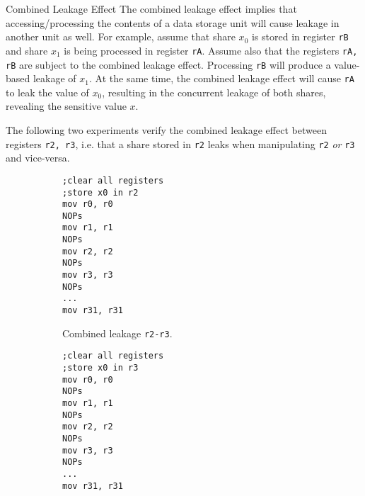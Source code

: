\begin{subsection}{Combined Leakage Effect}
\label{combined_leakage}
The combined leakage effect implies that accessing/processing the contents of a data storage unit will cause leakage in another unit as well. For example, assume that share $x_0$ is stored in register \texttt{rB} and share $x_1$ is being processed in register \texttt{rA}. Assume also that the registers \texttt{rA, rB} are subject to the combined leakage effect. Processing \texttt{rB} will produce a value-based leakage of $x_1$. At the same time, the combined leakage effect will cause \texttt{rA} to leak the value of $x_0$, resulting in the concurrent leakage of both shares, revealing the sensitive value $x$.

The following two experiments verify the combined leakage effect between registers \texttt{r2, r3}, i.e. that a share stored in \texttt{r2} leaks when manipulating \texttt{r2} \emph{or} \texttt{r3} and vice-versa.
\begin{figure}[H]
    \centering
\begin{subfigure}[b]{0.4\textwidth}
\texttt{;clear all registers\\
;store x0 in r2 \\
mov r0, r0\\
NOPs \\
mov r1, r1\\
NOPs \\
mov r2, r2\\
NOPs \\
mov r3, r3 \\
NOPs \\
...\\
mov r31, r31 }

        \caption{\scriptsize{Combined leakage \texttt{r2-r3}.}}

    \end{subfigure}
\begin{subfigure}[b]{0.4\textwidth}
\texttt{;clear all registers\\
;store x0 in r3 \\
mov r0, r0\\
NOPs \\
mov r1, r1\\
NOPs \\
mov r2, r2\\
NOPs \\
mov r3, r3 \\
NOPs \\
...\\
mov r31, r31 }


\end{subfigure}
\end{figure}
\end{subsection}
